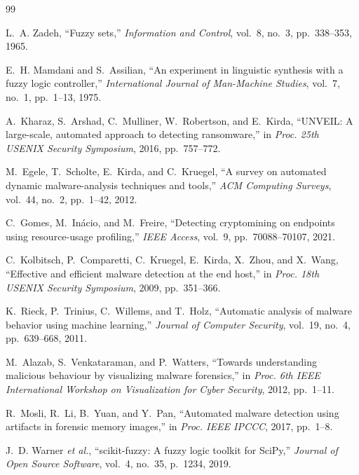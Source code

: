 \documentclass[conference]{IEEEtran}
\begin{document}
\begin{thebibliography}{99}

L.~A. Zadeh,
``Fuzzy sets,''
\textit{Information and Control}, vol.~8, no.~3, pp.~338--353, 1965.

E.~H. Mamdani and S.~Assilian,
``An experiment in linguistic synthesis with a fuzzy logic controller,''
\textit{International Journal of Man-Machine Studies}, vol.~7, no.~1,
pp.~1--13, 1975.

A.~Kharaz, S.~Arshad, C.~Mulliner, W.~Robertson, and E.~Kirda,
``UNVEIL: A large-scale, automated approach to detecting ransomware,''
in \textit{Proc. 25th USENIX Security Symposium}, 2016, pp.~757--772.

M.~Egele, T.~Scholte, E.~Kirda, and C.~Kruegel,
``A survey on automated dynamic malware-analysis techniques and tools,''
\textit{ACM Computing Surveys}, vol.~44, no.~2, pp.~1--42, 2012.

C.~Gomes, M.~In\'{a}cio, and M.~Freire,
``Detecting cryptomining on endpoints using resource-usage profiling,''
\textit{IEEE Access}, vol.~9, pp.~70088--70107, 2021.

C.~Kolbitsch, P.~Comparetti, C.~Kruegel, E.~Kirda, X.~Zhou, and X.~Wang,
``Effective and efficient malware detection at the end host,''
in \textit{Proc. 18th USENIX Security Symposium}, 2009, pp.~351--366.

K.~Rieck, P.~Trinius, C.~Willems, and T.~Holz,
``Automatic analysis of malware behavior using machine learning,''
\textit{Journal of Computer Security}, vol.~19, no.~4,
pp.~639--668, 2011.

M.~Alazab, S.~Venkataraman, and P.~Watters,
``Towards understanding malicious behaviour by visualizing malware
forensics,''
in \textit{Proc. 6th IEEE International Workshop on Visualization for
Cyber Security}, 2012, pp.~1--11.

R.~Mosli, R.~Li, B.~Yuan, and Y.~Pan,
``Automated malware detection using artifacts in forensic memory images,''
in \textit{Proc. IEEE IPCCC}, 2017, pp.~1--8.

J.~D. Warner \textit{et al.},
``scikit-fuzzy: A fuzzy logic toolkit for SciPy,''
\textit{Journal of Open Source Software}, vol.~4, no.~35, p.~1234, 2019.

\end{thebibliography}
\end{document}

